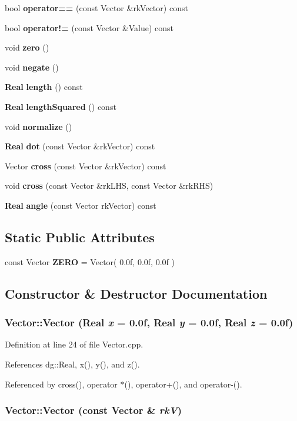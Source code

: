 \begin{CompactItemize}
bool {\bf operator==} (const Vector \&rk\-Vector) const
\item 
bool {\bf operator!=} (const Vector \&Value) const
\item 
void {\bf zero} ()
\item 
void {\bf negate} ()
\item 
{\bf Real} {\bf length} () const
\item 
{\bf Real} {\bf length\-Squared} () const
\item 
void {\bf normalize} ()
\item 
{\bf Real} {\bf dot} (const Vector \&rk\-Vector) const
\item 
Vector {\bf cross} (const Vector \&rk\-Vector) const
\item 
void {\bf cross} (const Vector \&rk\-LHS, const Vector \&rk\-RHS)
\item 
{\bf Real} {\bf angle} (const Vector rk\-Vector) const
\end{CompactItemize}
\subsection*{Static Public Attributes}
\begin{CompactItemize}
\item 
const Vector {\bf ZERO} = Vector( 0.0f, 0.0f, 0.0f )
\end{CompactItemize}


\subsection{Constructor \& Destructor Documentation}
\subsubsection{\setlength{\rightskip}{0pt plus 5cm}Vector::Vector ({\bf Real} {\em x} = 0.0f, {\bf Real} {\em y} = 0.0f, {\bf Real} {\em z} = 0.0f)}\label{classdg_1_1Vector_a0}




Definition at line 24 of file Vector.cpp.

References dg::Real, x(), y(), and z().

Referenced by cross(), operator $\ast$(), operator+(), and operator-().
\subsubsection{\setlength{\rightskip}{0pt plus 5cm}Vector::Vector (const Vector \& {\em rk\-V})}\label{classdg_1_1Vector_a1}




